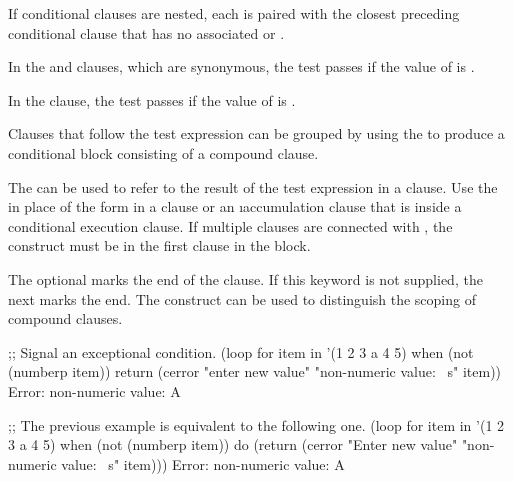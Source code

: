 If conditional clauses are nested, each  is paired
with the closest preceding conditional clause that has no
associated  or . 

In the  and  clauses, which are
synonymous, the test passes if the value of  is
.

In the  clause,
the test passes if the value of  is .

 
Clauses that follow the test expression can be grouped by using 
the   to produce a conditional block consisting of 
a compound clause.
 
The   can be used to refer to the result
of the test expression in a clause.
Use the   in place of the form in a
 clause or an \i{accumulation} clause that is
inside a conditional execution clause.
If multiple clauses are connected with , the 
construct must be in the first clause in the block.
 
The optional   marks the end of the clause.  If this
keyword is not supplied, the next  marks the end.  The construct
 can be used to distinguish the scoping of compound clauses.
 

\code
;; Signal an exceptional condition.
 (loop for item in '(1 2 3 a 4 5)
       when (not (numberp item))
        return (cerror "enter new value" "non-numeric value: ~s" item))
Error: non-numeric value: A
 
;; The previous example is equivalent to the following one.
 (loop for item in '(1 2 3 a 4 5)
       when (not (numberp item))
        do (return 
            (cerror "Enter new value" "non-numeric value: ~s" item)))
Error: non-numeric value: A
\endcode

